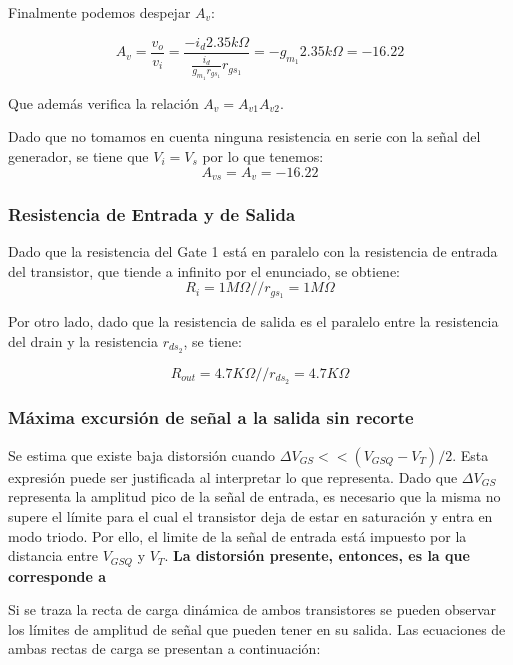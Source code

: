 \documentclass[a4paper, 10pt, spanish]{article}
\begin{document}
Finalmente podemos despejar $A_v$:

\begin{equation}
  A_v=\frac{v_o}{v_i}=\frac{-i_d 2.35k\Omega}{\frac{i_d}{ g_{m_1} r_{gs_1} } r_{gs_1} } = -g_{m_1} 2.35k\Omega = -16.22
  \label{eq:av}
\end{equation}

Que además verifica la relación $A_v = A_{v1} A_{v2}$.

Dado que no tomamos en cuenta ninguna resistencia en serie con la señal del generador, se tiene que $V_i=V_s$ por lo que tenemos:
\begin{equation}
  A_{vs}=A_{v}=-16.22
\end{equation}

\subsubsection{Resistencia de Entrada y de Salida}
Dado que la resistencia del Gate 1 está en paralelo con la resistencia de entrada del transistor, que tiende a infinito por el enunciado, se obtiene:
\begin{equation}
  R_i=1M\Omega // r_{gs_1} = 1M\Omega
\end{equation}

Por otro lado, dado que la resistencia de salida es el paralelo entre la resistencia del drain y la resistencia $r_{ds_2}$, se tiene:

\begin{equation}
  R_{out}=4.7K\Omega // r_{ds_2} = 4.7K\Omega
\end{equation}

\subsubsection{Máxima excursión de señal a la salida sin recorte}

Se estima que existe baja distorsión cuando $\Delta V_{GS} << (V_{GSQ}-V_T)/2$. Esta expresión puede ser justificada al interpretar lo que representa. Dado que $\Delta V_{GS}$ representa la amplitud pico de la señal de entrada, es necesario que la misma no supere el límite para el cual el transistor deja de estar en saturación y entra en modo triodo. Por ello, el limite de la señal de entrada está impuesto por la distancia entre $V_{GSQ}$ y $V_T$. \textbf{La distorsión presente, entonces, es la que corresponde a}

Si se traza la recta de carga dinámica de ambos transistores se pueden observar los límites de amplitud de señal que pueden tener en su salida. Las ecuaciones de ambas rectas de carga se presentan a continuación:
\end{document}
